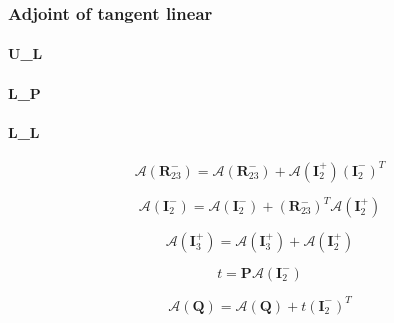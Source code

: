 \subsubsection{Adjoint of tangent linear}
\label{sec:radiance-boa_radiance-adjoint_of_tangent_linear}

\paragraph{U\_L}
\label{sec:radiance-boa_radiance-adjoint_of_tangent_linear-u_l}


\paragraph{L\_P}
\label{sec:radiance-boa_radiance-adjoint_of_tangent_linear-l_p}


\paragraph{L\_L}
\label{sec:radiance-boa_radiance-adjoint_of_tangent_linear-l_l}

\begin{equation}
\mathcal{A}(\mathbf{R}^{-}_{23}) = \mathcal{A}(\mathbf{R}^{-}_{23}) + \mathcal{A}(\mathbf{I}^{+}_{2})(\mathbf{I}^{-}_{2})^{T}
\label{eq:radiance-boa_radiance-adjoint_of_tangent_linear-l_l_R_m_23_a}
\end{equation}

\begin{equation}
\mathcal{A}(\mathbf{I}^{-}_{2}) = \mathcal{A}(\mathbf{I}^{-}_{2}) + (\mathbf{R}^{-}_{23})^{T}\mathcal{A}(\mathbf{I}^{+}_{2})
\label{eq:radiance-boa_radiance-adjoint_of_tangent_linear-l_l_I_m_2_a}
\end{equation}

\begin{equation}
\mathcal{A}(\mathbf{I}^{+}_{3}) = \mathcal{A}(\mathbf{I}^{+}_{3}) + \mathcal{A}(\mathbf{I}^{+}_{2})
\label{eq:radiance-boa_radiance-adjoint_of_tangent_linear-l_l_I_p_3_a}
\end{equation}

\begin{equation}
t = \mathbf{P}\mathcal{A}(\mathbf{I}^{-}_{2})
\label{eq:radiance-boa_radiance-adjoint_of_tangent_linear-l_l_t}
\end{equation}

\begin{equation}
\mathcal{A}(\mathbf{Q}) =\mathcal{A}(\mathbf{Q}) + t (\mathbf{I}^{-}_{2})^{T}
\label{eq:radiance-boa_radiance-adjoint_of_tangent_linear-l_l_Q_a}
\end{equation}

